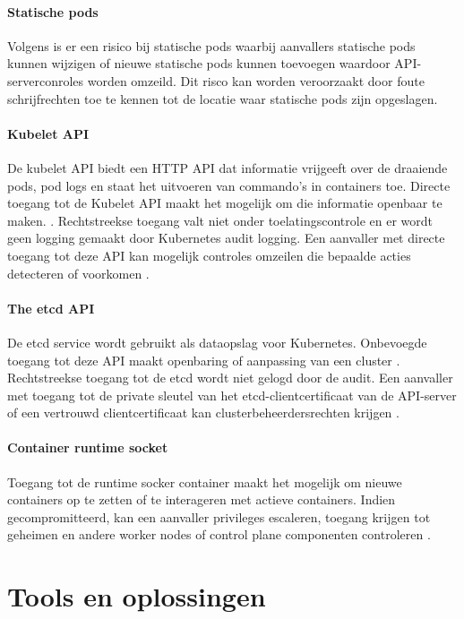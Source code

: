 \paragraph{Statische pods}
Volgens \textcite{KubernetesDocs-2023} is er een risico bij statische pods waarbij aanvallers statische pods kunnen wijzigen of nieuwe statische pods kunnen toevoegen waardoor API-serverconroles worden omzeild. 
Dit risco kan worden veroorzaakt door foute schrijfrechten toe te kennen tot de locatie waar statische pods zijn opgeslagen.

\paragraph{Kubelet API}
De kubelet API biedt een HTTP API dat informatie vrijgeeft over de draaiende pods, pod logs en staat het uitvoeren van commando's in containers toe.
Directe toegang tot de Kubelet API maakt het mogelijk om die informatie openbaar te maken. \autocite{KubernetesDocs-2023}.
Rechtstreekse toegang valt niet onder toelatingscontrole en er wordt geen logging gemaakt door Kubernetes audit logging. Een aanvaller met directe toegang tot deze API kan mogelijk controles omzeilen die bepaalde acties detecteren of voorkomen \autocite{KubernetesDocs-2023}.

\paragraph{The etcd API}
De etcd service wordt gebruikt als dataopslag voor Kubernetes. Onbevoegde toegang tot deze API maakt openbaring of aanpassing van een cluster \autocite{KubernetesDocs-2023}. Rechtstreekse toegang tot de etcd wordt niet gelogd door de audit.
Een aanvaller met toegang tot de private sleutel van het etcd-clientcertificaat van de API-server of een vertrouwd clientcertificaat kan clusterbeheerdersrechten krijgen \autocite{KubernetesDocs-2023}.

\paragraph{Container runtime socket}
Toegang tot de runtime socker container maakt het mogelijk om nieuwe containers op te zetten of te interageren met actieve containers. Indien gecompromitteerd, kan een aanvaller privileges escaleren, toegang krijgen tot geheimen en andere worker nodes of control plane componenten controleren \autocite{KubernetesDocs-2023}.

\section{Tools en oplossingen}

